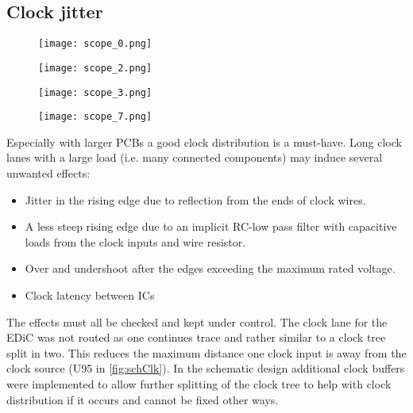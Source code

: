 \subsection{Clock jitter}
\begin{sidewaysfigure}[p]
  \centering
  \begin{subfigure}[b]{.45\textwidth}
    \texttt{[image: scope\_0.png]}
    \label{fig:clkDefault}
  \end{subfigure}%
  \hspace{.05\textwidth}
  \begin{subfigure}[b]{.45\textwidth}
    \texttt{[image: scope\_2.png]}
    \label{fig:clk33Ohm}
  \end{subfigure}

  \begin{subfigure}[b]{.45\textwidth}
    \texttt{[image: scope\_3.png]}
    \label{fig:clkTerm}
  \end{subfigure}%
  \hspace{.05\textwidth}
  \begin{subfigure}[b]{.45\textwidth}
    \texttt{[image: scope\_7.png]}
    \label{fig:clkLatency}
  \end{subfigure}
  \caption[Comparison of the clock rising edge in different configurations.]{Comparison of the rising edge of the clock in different configurations. Measured close to the clock buffer (yellow) and in \cref{fig:clkLatency} at the end of a clock lane (U204 pin 8) (green).}
\end{sidewaysfigure}
Especially with larger \glspl{PCB} a good clock distribution is a must-have.
Long clock lanes with a large load (i.e. many connected components) may induce several unwanted effects:
\begin{itemize}
  \item Jitter in the rising edge due to reflection from the ends of clock wires.
  \item A less steep rising edge due to an implicit RC-low pass filter with capacitive loads from the clock inputs and wire resistor.
  \item Over and undershoot after the edges exceeding the maximum rated voltage.
  \item Clock latency between \glspl{IC}
\end{itemize}
The effects must all be checked and kept under control.
The clock lane for the \gls{EDiC} was not routed as one continues trace and rather similar to a clock tree split in two.
This reduces the maximum distance one clock input is away from the clock source (U95 in \cref{fig:schClk}).
In the schematic design additional clock buffers were implemented to allow further splitting of the clock tree to help with clock distribution if it occurs and cannot be fixed other ways.

